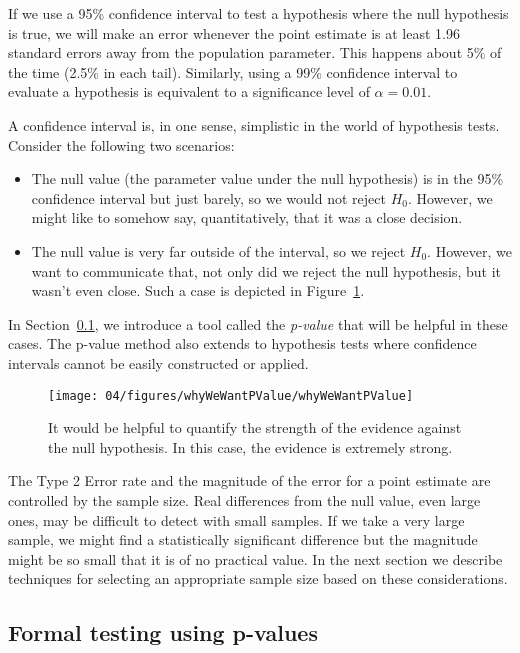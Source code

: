 If we use a 95\% confidence interval to test a hypothesis where the null hypothesis is true, we will make an error whenever the point estimate is at least 1.96 standard errors away from the population parameter. This happens about 5\% of the time (2.5\% in each tail). Similarly, using a 99\% confidence interval to evaluate a hypothesis is equivalent to a significance level of $\alpha = 0.01$.

A confidence interval is, in one sense, simplistic in the world of hypothesis tests. Consider the following two scenarios:
\begin{itemize}
\setlength{\itemsep}{0mm}
\item The null value (the parameter value under the null hypothesis) is in the 95\% confidence interval but just barely, so we would not reject $H_0$. However, we might like to somehow say, quantitatively, that it was a close decision.
\item The null value is very far outside of the interval, so we reject $H_0$. However, we want to communicate that, not only did we reject the null hypothesis, but it wasn't even close. Such a case is depicted in Figure~\ref{whyWeWantPValue}.
\end{itemize}
In Section~\ref{pValue}, we introduce a tool called the \emph{p-value} that will be helpful in these cases. The p-value method also extends to hypothesis tests where confidence intervals cannot be easily constructed or applied.

\begin{figure}[hht]
\centering
\texttt{[image: 04/figures/whyWeWantPValue/whyWeWantPValue]}
\caption{It would be helpful to quantify the strength of the evidence against the null hypothesis. In this case, the evidence is extremely strong.}
\label{whyWeWantPValue}
\end{figure}

The Type 2 Error rate and the magnitude of the error for a point estimate are controlled by the sample size. Real differences from the null value, even large ones, may be difficult to detect with small samples. If we take a very large sample, we might find a statistically significant difference but the magnitude might be so small that it is of no practical value. In the next section we describe techniques for selecting an appropriate sample size based on these considerations.


\subsection{Formal testing using p-values}
\label{pValue}

